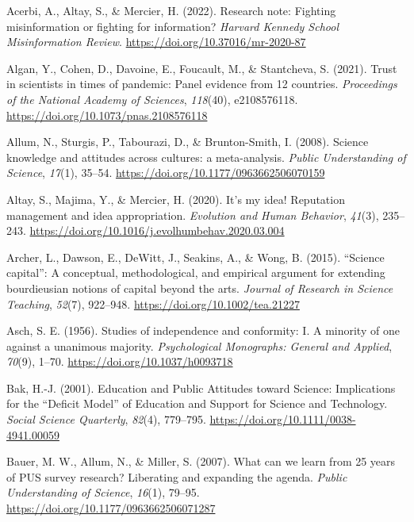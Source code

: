 \documentclass[
  jou,
  floatsintext,
  longtable,
  nolmodern,
  notxfonts,
  notimes,
  colorlinks=true,linkcolor=blue,citecolor=blue,urlcolor=blue]{apa7}
\newlength{\cslhangindent}
\newenvironment{CSLReferences}[2] %
 {\begin{list}{}{%
  \setlength{\itemindent}{0pt}
  \setlength{\leftmargin}{0pt}
  \setlength{\parsep}{0pt}
  \ifodd #1
   \setlength{\leftmargin}{\cslhangindent}
   \setlength{\itemindent}{-1\cslhangindent}
  \fi
  \setlength{\itemsep}{#2\baselineskip}}}
 {\end{list}}
\begin{document}
\label{refs}
\begin{CSLReferences}{1}{0}
Acerbi, A., Altay, S., \& Mercier, H. (2022). Research note: Fighting
misinformation or fighting for information? \emph{Harvard Kennedy School
Misinformation Review}. \url{https://doi.org/10.37016/mr-2020-87}

Algan, Y., Cohen, D., Davoine, E., Foucault, M., \& Stantcheva, S.
(2021). Trust in scientists in times of pandemic: Panel evidence from 12
countries. \emph{Proceedings of the National Academy of Sciences},
\emph{118}(40), e2108576118.
\url{https://doi.org/10.1073/pnas.2108576118}

Allum, N., Sturgis, P., Tabourazi, D., \& Brunton-Smith, I. (2008).
Science knowledge and attitudes across cultures: a meta-analysis.
\emph{Public Understanding of Science}, \emph{17}(1), 35--54.
\url{https://doi.org/10.1177/0963662506070159}

Altay, S., Majima, Y., \& Mercier, H. (2020). It's my idea! Reputation
management and idea appropriation. \emph{Evolution and Human Behavior},
\emph{41}(3), 235--243.
\url{https://doi.org/10.1016/j.evolhumbehav.2020.03.004}

Archer, L., Dawson, E., DeWitt, J., Seakins, A., \& Wong, B. (2015).
{``}Science capital{''}: A conceptual, methodological, and empirical
argument for extending bourdieusian notions of capital beyond the arts.
\emph{Journal of Research in Science Teaching}, \emph{52}(7), 922--948.
\url{https://doi.org/10.1002/tea.21227}

Asch, S. E. (1956). Studies of independence and conformity: I. A
minority of one against a unanimous majority. \emph{Psychological
Monographs: General and Applied}, \emph{70}(9), 1--70.
\url{https://doi.org/10.1037/h0093718}

Bak, H.-J. (2001). Education and Public Attitudes toward Science:
Implications for the {``}Deficit Model{''} of Education and Support for
Science and Technology. \emph{Social Science Quarterly}, \emph{82}(4),
779--795. \url{https://doi.org/10.1111/0038-4941.00059}

Bauer, M. W., Allum, N., \& Miller, S. (2007). What can we learn from 25
years of PUS survey research? Liberating and expanding the agenda.
\emph{Public Understanding of Science}, \emph{16}(1), 79--95.
\url{https://doi.org/10.1177/0963662506071287}


\end{CSLReferences}
\end{document}
